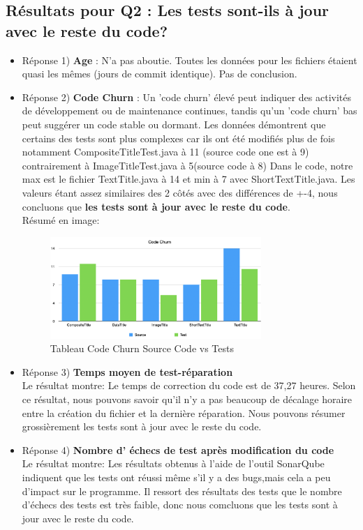 \documentclass{proc}
\begin{document}
\subsection{Résultats pour Q2 : Les tests sont-ils à jour avec le reste du code?}
\begin{itemize}
    \item Réponse 1) \textbf{Age} : N'a pas aboutie. Toutes les données pour les fichiers étaient quasi les mêmes (jours de commit identique). Pas de conclusion.
    \item Réponse 2) \textbf{Code Churn} : 
Un 'code churn' élevé peut indiquer des activités de développement ou de maintenance continues, tandis qu'un 'code churn' bas peut suggérer un code stable ou dormant. Les données démontrent que certains des tests sont plus complexes car ils ont été modifiés plus de fois notamment CompositeTitleTest.java à 11 (source code one est à 9) contrairement à ImageTitleTest.java à 5(source code à 8) Dans le code, notre max est le fichier TextTitle.java à 14 et min à 7 avec ShortTextTitle.java. Les valeurs étant assez similaires des 2 côtés avec des différences de +-4, nous concluons que \textbf{les tests sont à jour avec le reste du code}.\\
Résumé en image:\\
\begin{figure}[htp]
\includegraphics[width=8cm]{codechurn.png}
\caption{Tableau Code Churn Source Code vs Tests }
\end{figure}
    \item Réponse 3) \textbf{Temps moyen de test-réparation}
    \\Le résultat montre: Le temps de correction du code est de 37,27 heures. Selon ce résultat, nous pouvons savoir qu'il n'y a pas beaucoup de décalage horaire entre la création du fichier et la dernière réparation. Nous pouvons résumer grossièrement les tests sont à jour avec le reste du code.
    \item Réponse 4)\textbf{ Nombre d’ échecs de test après modification du code}
    \\Le résultat montre: Les résultats obtenus à l'aide de l'outil SonarQube indiquent que les tests ont réussi même s'il y a des bugs,mais cela a peu d'impact sur le programme. Il ressort des résultats des tests que le nombre d'échecs des tests est très faible, donc nous comcluons que les tests sont à jour avec le reste du code.
\end{itemize}
\end{document}

